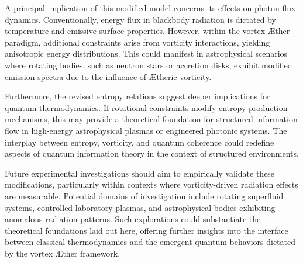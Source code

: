A principal implication of this modified model concerns its effects on photon flux dynamics. Conventionally, energy flux in blackbody radiation is dictated by temperature and emissive surface properties. However, within the vortex \AE{}ther paradigm, additional constraints arise from vorticity interactions, yielding anisotropic energy distributions. This could manifest in astrophysical scenarios where rotating bodies, such as neutron stars or accretion disks, exhibit modified emission spectra due to the influence of \AE{}theric vorticity.


Furthermore, the revised entropy relations suggest deeper implications for quantum thermodynamics. If rotational constraints modify entropy production mechanisms, this may provide a theoretical foundation for structured information flow in high-energy astrophysical plasmas or engineered photonic systems. The interplay between entropy, vorticity, and quantum coherence could redefine aspects of quantum information theory in the context of structured environments.


Future experimental investigations should aim to empirically validate these modifications, particularly within contexts where vorticity-driven radiation effects are measurable. Potential domains of investigation include rotating superfluid systems, controlled laboratory plasmas, and astrophysical bodies exhibiting anomalous radiation patterns. Such explorations could substantiate the theoretical foundations laid out here, offering further insights into the interface between classical thermodynamics and the emergent quantum behaviors dictated by the vortex \AE{}ther framework.

